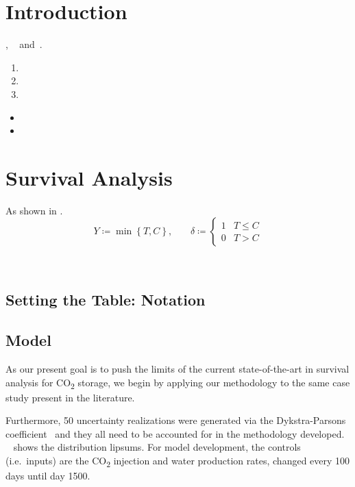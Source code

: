 \documentclass[conference]{spe}
\begin{document}
\spemaketitle

\section{Introduction}

\lipsum[1]{}, ~\cite{gurwicz24} and~\cite{gurwicz25}.
\begin{enumerate}
    \item \lipsum[3][1]
    \item \lipsum[3][2]
    \item \lipsum[3][3]
\end{enumerate}

\lipsum[2]
\begin{itemize}
    \item \lipsum[4][1]
    \item \lipsum[4][2]
\end{itemize}

\section{Survival Analysis}
\textcite{cox72} \lipsum[5][1-3]
As shown in .
\begin{equation}
    Y \coloneqq \min \left\{ T, C \right\}
    \text{,}\qquad
    \delta \coloneqq \begin{cases} 1 & T \leq C \\ 0 & T > C \end{cases}
    \label{eq:survival}
\end{equation}

\lipsum[5]~\parencite{bertsimas2017,bertsimas2019}

\subsection{Setting the Table: Notation}
\lipsum[6]

\subsection{Model}
As our present goal is to push the limits of the current state-of-the-art in survival analysis for CO\textsubscript{2} storage, we begin by applying our methodology to the same case study present in the literature.

Furthermore, 50 uncertainty realizations were generated via the Dykstra-Parsons coefficient~\parencite{dykstra50} and they all need to be accounted for in the methodology developed.
~ shows the distribution lipsums.
For model development, the controls (i.e.\ inputs) are the CO\textsubscript{2} injection and water production rates, changed every 100 days until day 1500.
\end{document}
